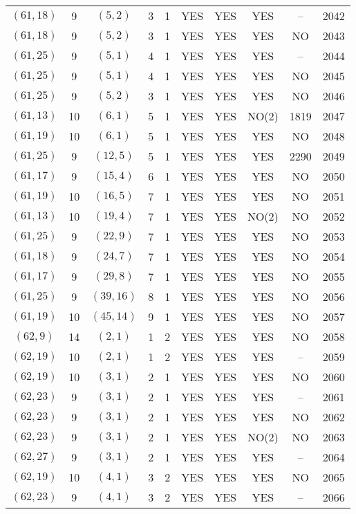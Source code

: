 \begin{longtable}{|c|c|c|c|c|c|c|c|c|c|}
$(61, 18)$ & 9 & $(5, 2)$ & 3 & 1 & YES & YES & YES & -- & 2042\\
$(61, 18)$ & 9 & $(5, 2)$ & 3 & 1 & YES & YES & YES & NO & 2043\\
$(61, 25)$ & 9 & $(5, 1)$ & 4 & 1 & YES & YES & YES & -- & 2044\\
$(61, 25)$ & 9 & $(5, 1)$ & 4 & 1 & YES & YES & YES & NO & 2045\\
$(61, 25)$ & 9 & $(5, 2)$ & 3 & 1 & YES & YES & YES & NO & 2046\\
$(61, 13)$ & 10 & $(6, 1)$ & 5 & 1 & YES & YES & NO(2) & 1819 & 2047\\
$(61, 19)$ & 10 & $(6, 1)$ & 5 & 1 & YES & YES & YES & NO & 2048\\
$(61, 25)$ & 9 & $(12, 5)$ & 5 & 1 & YES & YES & YES & 2290 & 2049\\
$(61, 17)$ & 9 & $(15, 4)$ & 6 & 1 & YES & YES & YES & NO & 2050\\
$(61, 19)$ & 10 & $(16, 5)$ & 7 & 1 & YES & YES & YES & NO & 2051\\
$(61, 13)$ & 10 & $(19, 4)$ & 7 & 1 & YES & YES & NO(2) & NO & 2052\\
$(61, 25)$ & 9 & $(22, 9)$ & 7 & 1 & YES & YES & YES & NO & 2053\\
$(61, 18)$ & 9 & $(24, 7)$ & 7 & 1 & YES & YES & YES & NO & 2054\\
$(61, 17)$ & 9 & $(29, 8)$ & 7 & 1 & YES & YES & YES & NO & 2055\\
$(61, 25)$ & 9 & $(39, 16)$ & 8 & 1 & YES & YES & YES & NO & 2056\\
$(61, 19)$ & 10 & $(45, 14)$ & 9 & 1 & YES & YES & YES & NO & 2057\\
$(62, 9)$ & 14 & $(2, 1)$ & 1 & 2 & YES & YES & YES & NO & 2058\\
$(62, 19)$ & 10 & $(2, 1)$ & 1 & 2 & YES & YES & YES & -- & 2059\\
$(62, 19)$ & 10 & $(3, 1)$ & 2 & 1 & YES & YES & YES & NO & 2060\\
$(62, 23)$ & 9 & $(3, 1)$ & 2 & 1 & YES & YES & YES & -- & 2061\\
$(62, 23)$ & 9 & $(3, 1)$ & 2 & 1 & YES & YES & YES & NO & 2062\\
$(62, 23)$ & 9 & $(3, 1)$ & 2 & 1 & YES & YES & NO(2) & NO & 2063\\
$(62, 27)$ & 9 & $(3, 1)$ & 2 & 1 & YES & YES & YES & -- & 2064\\
$(62, 19)$ & 10 & $(4, 1)$ & 3 & 2 & YES & YES & YES & NO & 2065\\
$(62, 23)$ & 9 & $(4, 1)$ & 3 & 2 & YES & YES & YES & -- & 2066\\

\end{longtable}
